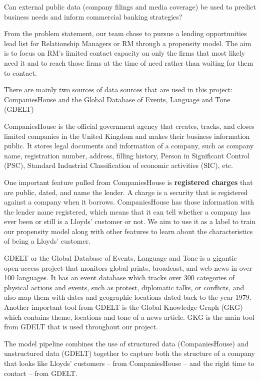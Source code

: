 \documentclass[ %
                    author={Natchalin Iwsakul \\[0.4em] Inkaphol Siriwongwattana \\[0.4em] Tanaphan Kummaraphat \\[0.6em] Patorn Srisupap},,
                supervisor={Fernando Moreno-Pino},
                    degree={MSc},
                     title={Propensity Modelling for SME Commercial Lending Using Open Public Data
},
                  subtitle={Companies House and GDELT as predictors of first-time borrowing},
                      type={},
                      year={2026}]{dissertation}
\begin{document}
\begin{displayquote}
Can external public data (company filings and media coverage) be used to predict business needs and inform commercial banking strategies?
\end{displayquote}

From the problem statement, our team chose to pursue a lending opportunities lead list for Relationship Managers or RM through a propensity model. The aim is to focus on RM's limited contact capacity on only the firms that most likely need it and to reach those firms at the time of need rather than waiting for them to contact.

There are mainly two sources of data sources that are used in this project: CompaniesHouse and the Global Database of Events, Language and Tone (GDELT)

CompaniesHouse is the official government agency that creates, tracks, and closes limited companies in the United Kingdom and makes their business information public. It stores legal documents and information of a company, such as company name, registration number, address, filling history, Person in Significant Control (PSC), Standard Industrial Classification of economic activities (SIC), etc. 
 
One important feature pulled from CompaniesHouse is \textbf{registered charges} that are public, dated, and name the lender. A charge is a security that is registered against a company when it borrows. CompaniesHouse has those information with the lender name registered, which means that it can tell whether a company has ever been or still is a Lloyds' customer or not. We aim to use it as a label to train our propensity model along with other features to learn about the characteristics of being a Lloyds' customer.

GDELT or the Global Database of Events, Language and Tone is a gigantic open-access project that monitors global prints, broadcast, and web news in over 100 languages. It has an event database which tracks over 300 categories of physical actions and events, such as protest, diplomatic talks, or conflicts, and also map them with dates and geographic locations dated back to the year 1979. Another important tool from GDELT is the Global Knowledge Graph (GKG) which contains theme, locations and tone of a news article. GKG is the main tool from GDELT that is used throughout our project.

The model pipeline combines the use of structured data (CompaniesHouse) and unstructured data (GDELT) together to capture both the structure of a company that looks like Lloyds' customers -- from CompaniesHouse -- and the right time to contact -- from GDELT.
\end{document}
